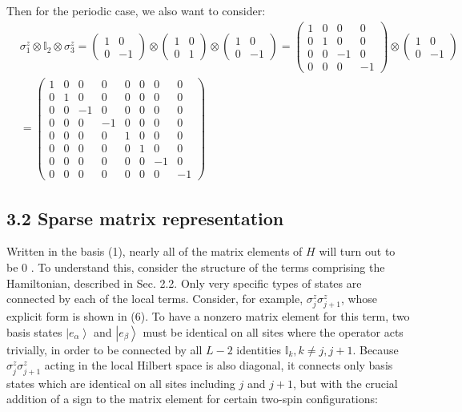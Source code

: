 \documentclass[12pt]{article}
\begin{document}
Then for the periodic case, we also want to consider:
\begin{equation}
\begin{aligned}
   & \sigma _1^z \otimes \mathbb{I}_2 \otimes \sigma _3^z = \begin{pmatrix} 1 & 0 \\ 0 & -1 \end{pmatrix} \otimes \begin{pmatrix} 1 & 0 \\ 0 & 1 \end{pmatrix} \otimes \begin{pmatrix} 1 & 0 \\ 0 & -1 \end{pmatrix} = \begin{pmatrix} 1 & 0 & 0 & 0 \\ 0 & 1 & 0 & 0 \\ 0 & 0 & -1 & 0 \\ 0 & 0 & 0 & -1 \end{pmatrix} \otimes \begin{pmatrix} 1 & 0 \\ 0 & -1 \end{pmatrix}\\
&= \begin{pmatrix} 1 & 0 & 0 & 0 & 0 & 0 & 0 & 0 \\ 0 & 1 & 0 & 0 & 0 & 0 & 0 & 0 \\ 0 & 0 & -1 & 0 & 0 & 0 & 0 & 0 \\ 0 & 0 & 0 & -1 & 0 & 0 & 0 & 0 \\ 0 & 0 & 0 & 0 & 1 & 0 & 0 & 0 \\ 0 & 0 & 0 & 0 & 0 & 1 & 0 & 0 \\ 0 & 0 & 0 & 0 & 0 & 0 & -1 & 0 \\ 0 & 0 & 0 & 0 & 0 & 0 & 0 & -1 \end{pmatrix}
\end{aligned}
\end{equation}





\subsection*{3.2 Sparse matrix representation}
Written in the basis (1), nearly all of the matrix elements of $H$ will turn out to be 0 . To understand this, consider the structure of the terms comprising the Hamiltonian, described in Sec. 2.2. Only very specific types of states are connected by each of the local terms. Consider, for example, $\sigma_{j}^{z} \sigma_{j+1}^{z}$, whose explicit form is shown in (6). To have a nonzero matrix element for this term, two basis states $\left|e_{\alpha}\right\rangle$ and $\left|e_{\beta}\right\rangle$ must be identical on all sites where the operator acts trivially, in order to be connected by all $L-2$ identities $\mathbb{I}_{k}, k \neq j, j+1$. Because $\sigma_{j}^{z} \sigma_{j+1}^{z}$ acting in the local Hilbert space is also diagonal, it connects only basis states which are identical on all sites including $j$ and $j+1$, but with the crucial addition of a sign to the matrix element for certain two-spin configurations:
\end{document}
